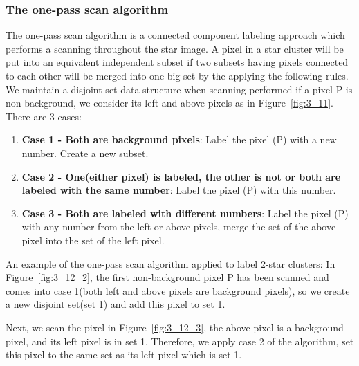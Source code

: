 \subsubsection{The one-pass scan algorithm}

The one-pass scan algorithm is a connected component labeling approach which performs a scanning throughout the star image. A pixel in a star cluster will be put into an equivalent independent subset if two subsets having pixels connected to each other will be merged into one big set by the applying the following rules. \\

\noindent We maintain a disjoint set data structure when scanning performed if a pixel P is non-background, we consider its left and above pixels as in Figure~\ref{fig:3_11}. There are 3 cases:

\begin{enumerate}
	\item \textbf{Case 1 - Both are background pixels}: Label the pixel (P) with a new number. Create a new subset.
	\item \textbf{Case 2 - One(either pixel) is labeled, the other is not or both are labeled with the same number}: Label the pixel (P) with this number.
	\item \textbf{Case 3 - Both are labeled with different numbers}: Label the pixel (P) with any number from the left or above pixels, merge the set of the above pixel into the set of the left pixel.
\end{enumerate}


\noindent An example of the one-pass scan algorithm applied to label 2-star clusters: In Figure~\ref{fig:3_12_2}, the first non-background pixel P has been scanned and comes into case 1(both left and above pixels are background pixels), so we create a new disjoint set(set 1) and add this pixel to set 1.


\noindent Next, we scan the pixel in Figure~\ref{fig:3_12_3}, the above pixel is a background pixel, and its left pixel is in set 1. Therefore, we apply case 2 of the algorithm, set this pixel to the same set as its left pixel which is set 1.


